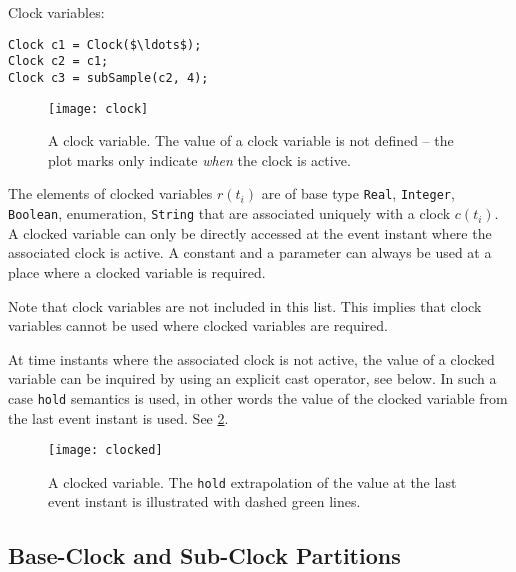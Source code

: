 \begin{example}
Clock variables:
\begin{lstlisting}[language=modelica]
Clock c1 = Clock($\ldots$);
Clock c2 = c1;
Clock c3 = subSample(c2, 4);
\end{lstlisting}
\end{example}

\begin{figure}[H]
  \begin{center}
    \texttt{[image: clock]}
  \end{center}
  \caption{%
    A clock variable.
    The value of a clock variable is not defined -- the plot marks only indicate \emph{when} the clock is active.
  }\label{fig:clock-variable}
\end{figure}

\begin{definition}\label{def:clocked-variable}
The elements of clocked variables $r(t_{i})$ are of base type \lstinline!Real!, \lstinline!Integer!, \lstinline!Boolean!, enumeration, \lstinline!String! that are associated uniquely with a clock $c(t_{i})$.
A clocked variable can only be directly accessed at the event instant where the associated clock is active.
A constant and a parameter can always be used at a place where a clocked variable is required.
\begin{nonnormative}
Note that clock variables are not included in this list.
This implies that clock variables cannot be used where clocked variables are required.
\end{nonnormative}

At time instants where the associated clock is not active, the value of a clocked variable can be inquired by using an explicit cast operator, see below.
In such a case \lstinline!hold! semantics is used, in other words the value of the clocked variable from the last event instant is used.
See \cref{fig:clocked-variable}.
\end{definition}

\begin{figure}[H]
  \begin{center}
    \texttt{[image: clocked]}
  \end{center}
  \caption{
    A clocked variable.
    The \lstinline!hold! extrapolation of the value at the last event instant is illustrated with dashed green lines.
  }\label{fig:clocked-variable}
\end{figure}

\subsection{Base-Clock and Sub-Clock Partitions}\label{base-clock-and-sub-clock-partitions}

